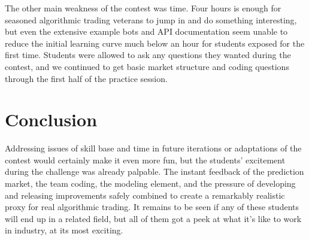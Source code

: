 \documentclass{article}
\begin{document}
The other main weakness of the contest was time. Four hours is enough for seasoned algorithmic
trading veterans to jump in and do something interesting, but even the extensive example bots and
API documentation seem unable to reduce the initial learning curve much below an hour for students
exposed for the first time. Students were allowed to ask any questions they wanted during the
contest, and we continued to get basic market structure and coding questions through the first half
of the practice session.



\section{Conclusion}

Addressing issues of skill base and time in future iterations or adaptations of the contest would
certainly make it even more fun, but the students' excitement during the challenge was already
palpable. The instant feedback of the prediction market, the team coding, the modeling element, and
the pressure of developing and releasing improvements safely combined to create a remarkably
realistic proxy for real algorithmic trading. It remains to be seen if any of these students will
end up in a related field, but all of them got a peek at what it's like to work in industry, at its
most exciting.
\end{document}
